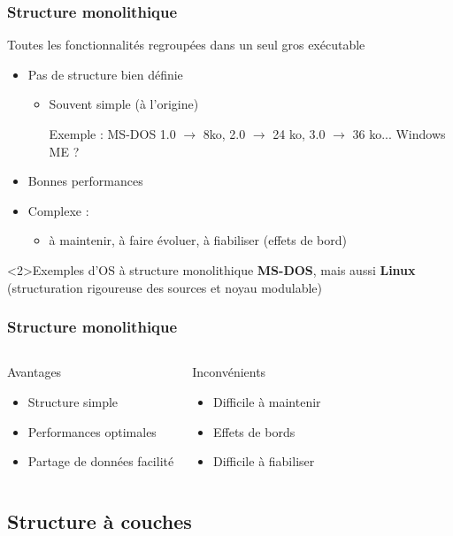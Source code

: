 \begin{frame}
\frametitle{Structure monolithique}
Toutes les fonctionnalités regroupées dans un seul gros exécutable
\begin{itemize}
\item Pas de structure bien définie
\begin{itemize}
\item Souvent simple (à l’origine)

Exemple : MS-DOS 1.0 $\rightarrow$ 8ko, 2.0 $\rightarrow$ 24 ko, 3.0 $\rightarrow$ 36 ko... Windows ME ?
\end{itemize}
\item Bonnes performances
\item Complexe :
\begin{itemize}
\item à maintenir, à faire évoluer, à fiabiliser (effets de bord)
\end{itemize}
\end{itemize}
\begin{exampleblock}<2>{Exemples d'OS à structure monolithique}
\textbf{MS-DOS}, mais aussi \textbf{Linux} (structuration rigoureuse des sources et noyau modulable)
\end{exampleblock}
\end{frame}


\begin{frame}
\frametitle{Structure monolithique}
\begin{columns}
\begin{block}{Avantages}
\begin{itemize}
\item Structure simple
\item Performances optimales
\item Partage de données facilité
\end{itemize}
\end{block}
\begin{block}{Inconvénients}
\begin{itemize}
\item Difficile à maintenir
\item Effets de bords
\item Difficile à fiabiliser
\end{itemize}
\end{block}
\end{columns}
\end{frame}


\subsection{Structure à couches}

